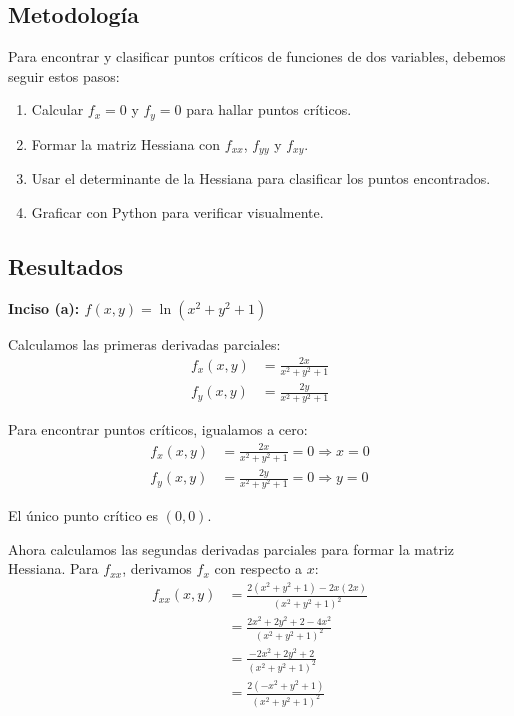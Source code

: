 \documentclass{article}
\begin{document}
\subsection{Metodología}

Para encontrar y clasificar puntos críticos de funciones de dos variables, debemos seguir estos pasos:
\begin{enumerate}
    \item Calcular $f_x = 0$ y $f_y = 0$ para hallar puntos críticos.
    \item Formar la matriz Hessiana con $f_{xx}$, $f_{yy}$ y $f_{xy}$.
    \item Usar el determinante de la Hessiana para clasificar los puntos encontrados.
    \item Graficar con Python para verificar visualmente.
\end{enumerate}

\subsection{Resultados}
\setcounter{equation}{0}

\textbf{Inciso (a): $f(x,y) = \ln(x^{2} + y^{2} + 1)$}

Calculamos las primeras derivadas parciales:
\begin{align}
f_x(x,y) &= \frac{2x}{x^2 + y^2 + 1} \\
f_y(x,y) &= \frac{2y}{x^2 + y^2 + 1}
\end{align}

Para encontrar puntos críticos, igualamos a cero:
\begin{align}
f_x(x,y) &= \frac{2x}{x^2 + y^2 + 1} = 0 \Rightarrow x = 0 \\
f_y(x,y) &= \frac{2y}{x^2 + y^2 + 1} = 0 \Rightarrow y = 0
\end{align}

El único punto crítico es $(0,0)$.

Ahora calculamos las segundas derivadas parciales para formar la matriz Hessiana. Para $f_{xx}$, derivamos $f_x$ con respecto a $x$:
\begin{align}
f_{xx}(x,y) &=  \frac{2(x^2 + y^2 + 1) - 2x(2x)}{(x^2 + y^2 + 1)^2} \\
&= \frac{2x^2 + 2y^2 + 2 - 4x^2}{(x^2 + y^2 + 1)^2} \\
&= \frac{-2x^2 + 2y^2 + 2}{(x^2 + y^2 + 1)^2} \\
&= \frac{2(-x^2 + y^2 + 1)}{(x^2 + y^2 + 1)^2}
\end{align}
\end{document}
